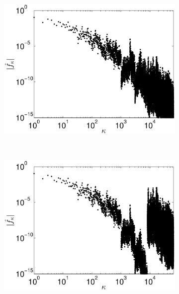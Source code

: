 \documentclass[11pt,compress]{beamer} %
\begin{document}
\begin{frame}
\begin{figure}\centering
\begin{subfigure}[b]{0.35\textwidth}
\includegraphics[width=1.\textwidth]{Images/WalshFourierCoeffDecayFilter.eps}
\end{subfigure}
~ %
\begin{subfigure}[b]{0.35\textwidth}
\includegraphics[width=1.\textwidth]{Images/fuzzy_WalshFourierCoeffDecayFilter.eps}
\end{subfigure}
\end{figure}
\end{frame}
\end{document}
